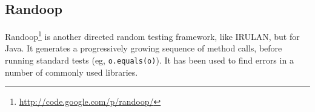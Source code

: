   \subsection{Randoop}
    Randoop\footnote{\url{http://code.google.com/p/randoop/}} is another directed random testing framework, like IRULAN, but for Java.
    It generates a progressively growing sequence of method calls, before running standard tests (eg, \verb|o.equals(o)|).
    It has been used to find errors in a number of commonly used libraries.

